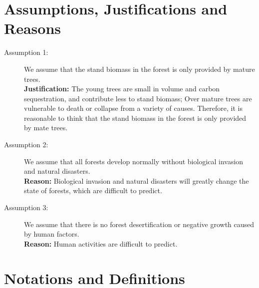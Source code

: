 \documentclass[12pt]{article}
\begin{document}
\section{Assumptions, Justifications and Reasons}
\begin{description}
    \item[\dag Assumption 1:]We assume that the stand biomass in the forest is only provided by mature trees.\\
    \textbf{Justification:}{ }The young trees are small in volume and carbon sequestration, and contribute less to stand biomass;
    Over mature trees are vulnerable to death or collapse from a variety of causes. Therefore,
    it is reasonable to think that the stand biomass in the forest is only provided by mate trees.
    \item[\dag Assumption 2:]We assume that all forests develop normally without biological invasion and natural disasters.\\
    \textbf{Reason:}{ }Biological invasion and natural disasters will greatly change the state of forests, which are difficult to predict.
    \item[\dag Assumption 3:]We assume that there is no forest desertification or negative growth caused by human factors.\\
    \textbf{Reason:}{ }Human activities are difficult to predict.
\end{description}

\section{Notations and Definitions}
\end{document}
